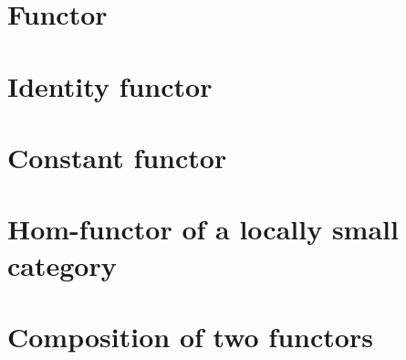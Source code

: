 \section{Functor}
    
\section{Identity functor}
    
\section{Constant functor}
    
\section{Hom-functor of a locally small category}
    
\section{Composition of two functors}
    
